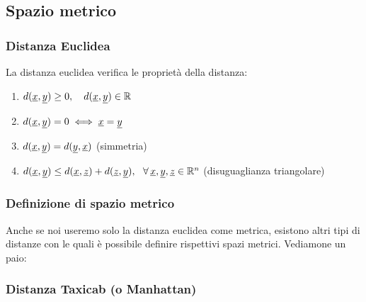 \subsection{Spazio metrico}

\subsubsection{Distanza Euclidea}


La distanza euclidea verifica le proprietà della distanza:

\begin{enumerate}
    \item  \(d(\underline{x},\underline{y}) \ge 0, \quad d(\underline{x},\underline{y}) \in \mathbb{R} \)
    \item  \(d(\underline{x},\underline{y}) = 0 \iff \underline{x} =\underline{y} \)
    \item  \(d(\underline{x},\underline{y}) = d(\underline{y},\underline{x})\) \hfill (simmetria)
    \item  \(d(\underline{x},\underline{y}) \le d(\underline{x},\underline{z}) + d(\underline{z},\underline{y}),\ \ \forall \, \underline{x},\underline{y},\underline{z} \in \mathbb{R}^{n}  \) \hfill (disuguaglianza triangolare)
\end{enumerate}

\subsubsection{Definizione di spazio metrico}


Anche se noi useremo solo la distanza euclidea come metrica, esistono altri tipi di distanze con le quali è possibile definire rispettivi spazi metrici. Vediamone un paio:

\subsubsection*{Distanza Taxicab (o Manhattan)}

